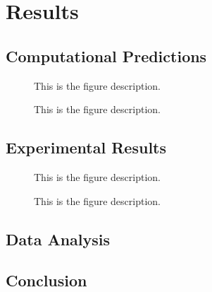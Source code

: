 \documentclass[oneside, astronomy, noacknowlegments]{BYUPhys}
\begin{document}
\chapter{Results}

\section{Computational Predictions}

\begin{figure}
    \caption[ODMR computational model for SiC]{\label{fig:SiCModel}
     This is the figure description.}
 \end{figure}

\begin{figure}
    \caption[ODMR computational model for CdTe]{\label{fig:CdTeModel}
     This is the figure description.}
 \end{figure}

\section{Experimental Results}

\begin{figure}
    \caption[Experimental ODMR for SiC]{\label{fig:SiCResults}
     This is the figure description.}
 \end{figure}

\begin{figure}
    \caption[Experimental ODMR for CdTe]{\label{fig:CdTeResults}
     This is the figure description.}
 \end{figure}


\section{Data Analysis}

\section{Conclusion}
\end{document}
